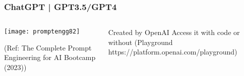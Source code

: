 





\begin{frame}[fragile]\frametitle{ChatGPT | GPT3.5/GPT4}


\begin{columns}
    \begin{column}[T]{0.6\linewidth}
		\begin{center}
		\texttt{[image: promptengg82]}

		{\tiny (Ref: The Complete Prompt Engineering for AI Bootcamp (2023))}
		\end{center}	
    \end{column}
    \begin{column}[T]{0.4\linewidth}
		Created by OpenAI
		Access it with code or without (Playground https://platform.openai.com/playground)
    \end{column}
  \end{columns}
\end{frame}










